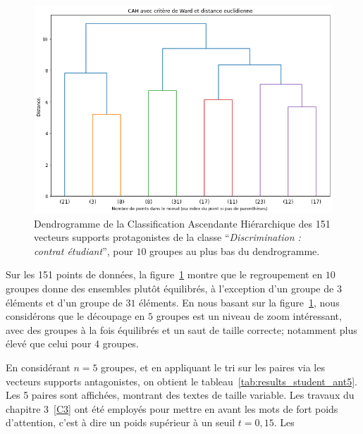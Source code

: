 \begin{figure}[h!tpb]
 \centering \includegraphics[width=\textwidth]{S4-Explicabilite_globale/figures/dendrogramme.png}
\caption{Dendrogramme de la Classification Ascendante Hiérarchique des 151 vecteurs supports protagonistes de la classe ``\textit{Discrimination : contrat étudiant}'', pour $10$ groupes au plus bas du dendrogramme. } \label{fig:dendrogramme}
\end{figure}

Sur les 151 points de données, la figure~\ref{fig:dendrogramme} montre que le regroupement en $10$ groupes donne des ensembles plutôt équilibrés, à l'exception d'un groupe de $3$ éléments et d'un groupe de $31$ éléments. En nous basant sur la figure~\ref{fig:dendrogramme}, nous considérons que le découpage en $5$ groupes est un niveau de zoom intéressant, avec des groupes à la fois équilibrés et un saut de taille correcte; notamment plus élevé que celui pour $4$ groupes.

En considérant $n=5$ groupes, et en appliquant le tri sur les paires via les vecteurs supports antagonistes, on obtient le tableau~\ref{tab:results_student_ant5}. Les 5 paires sont affichées, montrant des textes de taille variable. Les travaux du chapitre 3~\ref{C3} ont été employés pour mettre en avant les mots de fort poids d'attention, c'est à dire un poids supérieur à un seuil $t=0,15$. Les

